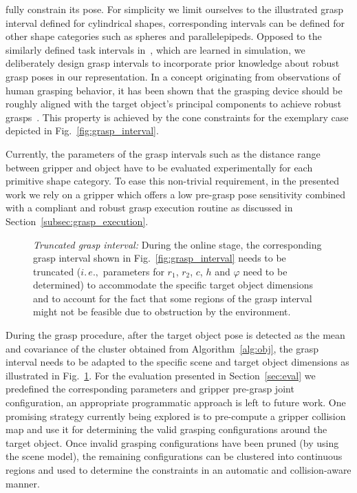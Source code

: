 fully constrain its pose. For simplicity we limit ourselves to the illustrated grasp interval
defined for cylindrical shapes, corresponding intervals can be defined for other shape categories
such as spheres and parallelepipeds. Opposed to the similarly defined task intervals
in~\cite{Gien08a, Gien08b}, which are learned in simulation, we deliberately design grasp intervals
to incorporate prior knowledge about robust grasp poses in our representation. In a concept
originating from observations of human grasping behavior, it has been shown that the grasping device
should be roughly aligned with the target object's principal components to achieve robust
grasps~\cite{Bala12}. This property is achieved by the cone constraints for the exemplary case
depicted in Fig.~\ref{fig:grasp_interval}.

Currently, the parameters of the grasp intervals such as the distance range between gripper and
object have to be evaluated experimentally for each primitive shape category. To ease this
non-trivial requirement, in the presented work we rely on a gripper which offers a low pre-grasp
pose sensitivity combined with a compliant and robust grasp execution routine as discussed in
Section~\ref{subsec:grasp_execution}.
%
\begin{figure}[t!] 
   \centering
     
    \caption{\textit{Truncated grasp interval:} During the online stage, the corresponding grasp
      interval shown in Fig.~\ref{fig:grasp_interval} needs to be truncated ($i.\,e.,$ parameters
      for $r_1$, $r_2$, $c$, $h$ and $\varphi$ need to be determined) to accommodate the specific
      target object dimensions and to account for the fact that some regions of the grasp interval
      might not be feasible due to obstruction by the environment.}
   \label{fig:truncated_grasp_interval}
   \vspace{-0.5cm}
\end{figure}

During the grasp procedure, after the target object pose is detected as the mean and covariance of
the cluster obtained from Algorithm~\ref{alg:obj}, the grasp interval needs to be adapted to the
specific scene and target object dimensions as illustrated in
Fig.~\ref{fig:truncated_grasp_interval}. For the evaluation presented in Section~\ref{sec:eval} we
predefined the corresponding parameters and gripper pre-grasp joint configuration, an appropriate
programmatic approach is left to future work.  One promising strategy currently being explored is to
pre-compute a gripper collision map and use it for determining the valid grasping configurations
around the target object.  Once invalid grasping configurations have been pruned (by using the scene
model), the remaining configurations can be clustered into continuous regions and used to determine
the constraints in an automatic and collision-aware manner.
%
